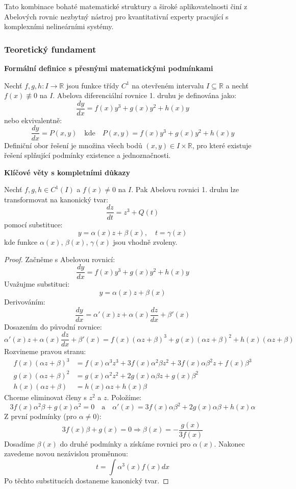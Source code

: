 Tato kombinace bohaté matematické struktury a široké aplikovatelnosti činí z Abelových rovnic nezbytný nástroj pro kvantitativní experty pracující s komplexními nelineárními systémy.

\subsubsection{Teoretický fundament}
\label{subsubsec:teorie-abel}

\noindent\textbf{Formální definice s přesnými matematickými podmínkami}

Nechť $f, g, h: I \to \mathbb{R}$ jsou funkce třídy $C^1$ na otevřeném intervalu $I \subseteq \mathbb{R}$ a nechť $f(x) \not\equiv 0$ na $I$. Abelova diferenciální rovnice 1. druhu je definována jako:
\[
\frac{dy}{dx} = f(x)y^3 + g(x)y^2 + h(x)y
\]
nebo ekvivalentně:
\[
\frac{dy}{dx} = P(x, y) \quad \text{kde} \quad P(x, y) = f(x)y^3 + g(x)y^2 + h(x)y
\]
Definiční obor řešení je množina všech bodů $(x, y) \in I \times \mathbb{R}$, pro které existuje řešení splňující podmínky existence a jednoznačnosti.

\vspace{1\baselineskip}

\noindent\textbf{Klíčové věty s kompletními důkazy}

\begin{theorem}
Nechť $f, g, h \in C^1(I)$ a $f(x) \neq 0$ na $I$. Pak Abelovu rovnici 1. druhu lze transformovat na kanonický tvar:
\[
\frac{dz}{dt} = z^3 + Q(t)
\]
pomocí substituce:
\[
y = \alpha(x)z + \beta(x), \quad t = \gamma(x)
\]
kde funkce $\alpha(x)$, $\beta(x)$, $\gamma(x)$ jsou vhodně zvoleny.
\end{theorem}

\begin{proof}
Začněme s Abelovou rovnicí:
\[
\frac{dy}{dx} = f(x)y^3 + g(x)y^2 + h(x)y
\]
Uvažujme substituci:
\[
y = \alpha(x)z + \beta(x)
\]
Derivováním:
\[
\frac{dy}{dx} = \alpha'(x)z + \alpha(x)\frac{dz}{dx} + \beta'(x)
\]
Dosazením do původní rovnice:
\[
\alpha'(x)z + \alpha(x)\frac{dz}{dx} + \beta'(x) = f(x)(\alpha z + \beta)^3 + g(x)(\alpha z + \beta)^2 + h(x)(\alpha z + \beta)
\]
Rozvineme pravou stranu:
\begin{align*}
f(x)(\alpha z + \beta)^3 &= f(x)\alpha^3 z^3 + 3f(x)\alpha^2\beta z^2 + 3f(x)\alpha\beta^2 z + f(x)\beta^3 \\
g(x)(\alpha z + \beta)^2 &= g(x)\alpha^2 z^2 + 2g(x)\alpha\beta z + g(x)\beta^2 \\
h(x)(\alpha z + \beta) &= h(x)\alpha z + h(x)\beta
\end{align*}
Chceme eliminovat členy s $z^2$ a $z$. Položíme:
\[
3f(x)\alpha^2\beta + g(x)\alpha^2 = 0 \quad \text{a} \quad \alpha'(x) = 3f(x)\alpha\beta^2 + 2g(x)\alpha\beta + h(x)\alpha
\]
Z první podmínky (pro $\alpha \neq 0$):
\[
3f(x)\beta + g(x) = 0 \Rightarrow \beta(x) = -\frac{g(x)}{3f(x)}
\]
Dosadíme $\beta(x)$ do druhé podmínky a získáme rovnici pro $\alpha(x)$. Nakonec zavedeme novou nezávislou proměnnou:
\[
t = \int \alpha^3(x)f(x)dx
\]
Po těchto substitucích dostaneme kanonický tvar.
\end{proof}

